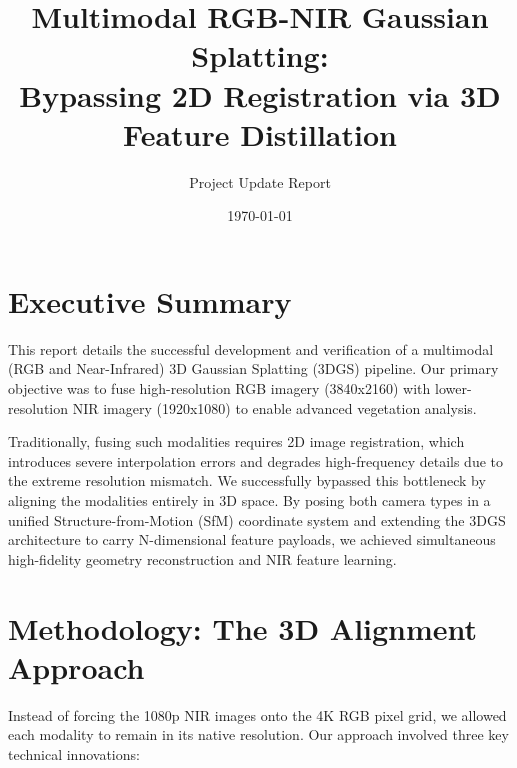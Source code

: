 \documentclass[12pt]{article}
\title{Multimodal RGB-NIR Gaussian Splatting: \\ Bypassing 2D Registration via 3D Feature Distillation}
\author{Project Update Report}
\date{\today}
\begin{document}
\maketitle

\section{Executive Summary}
This report details the successful development and verification of a multimodal (RGB and Near-Infrared) 3D Gaussian Splatting (3DGS) pipeline. Our primary objective was to fuse high-resolution RGB imagery (3840x2160) with lower-resolution NIR imagery (1920x1080) to enable advanced vegetation analysis. 

Traditionally, fusing such modalities requires 2D image registration, which introduces severe interpolation errors and degrades high-frequency details due to the extreme resolution mismatch. We successfully bypassed this bottleneck by aligning the modalities entirely in 3D space. By posing both camera types in a unified Structure-from-Motion (SfM) coordinate system and extending the 3DGS architecture to carry N-dimensional feature payloads, we achieved simultaneous high-fidelity geometry reconstruction and NIR feature learning.

\section{Methodology: The 3D Alignment Approach}
Instead of forcing the 1080p NIR images onto the 4K RGB pixel grid, we allowed each modality to remain in its native resolution. Our approach involved three key technical innovations:

\end{document}
